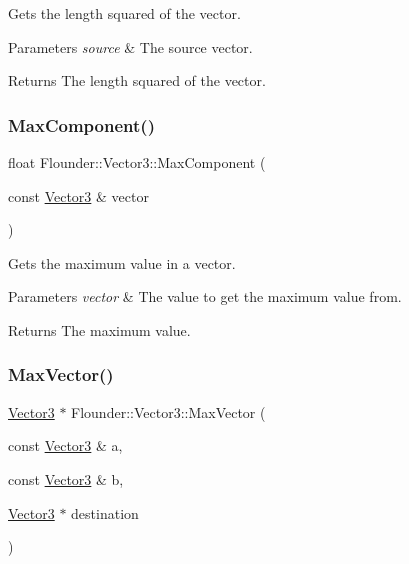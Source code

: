 Gets the length squared of the vector. 


\begin{DoxyParams}{Parameters}
{\em source} & The source vector. \\
\hline
\end{DoxyParams}
\begin{DoxyReturn}{Returns}
The length squared of the vector. 
\end{DoxyReturn}
\mbox{\label{class_flounder_1_1_vector3_ab84d4943fc80e3215387b1458bf58709}} 
\subsubsection{\texorpdfstring{Max\+Component()}{MaxComponent()}}
{\footnotesize\ttfamily float Flounder\+::\+Vector3\+::\+Max\+Component (\begin{DoxyParamCaption}\item[{const \hyperlink{class_flounder_1_1_vector3}{Vector3} \&}]{vector }\end{DoxyParamCaption})\hspace{0.3cm}{\ttfamily [static]}}



Gets the maximum value in a vector. 


\begin{DoxyParams}{Parameters}
{\em vector} & The value to get the maximum value from. \\
\hline
\end{DoxyParams}
\begin{DoxyReturn}{Returns}
The maximum value. 
\end{DoxyReturn}
\mbox{\label{class_flounder_1_1_vector3_a238085a03789f6d99c45340a82b72017}} 
\subsubsection{\texorpdfstring{Max\+Vector()}{MaxVector()}}
{\footnotesize\ttfamily \hyperlink{class_flounder_1_1_vector3}{Vector3} $\ast$ Flounder\+::\+Vector3\+::\+Max\+Vector (\begin{DoxyParamCaption}\item[{const \hyperlink{class_flounder_1_1_vector3}{Vector3} \&}]{a,  }\item[{const \hyperlink{class_flounder_1_1_vector3}{Vector3} \&}]{b,  }\item[{\hyperlink{class_flounder_1_1_vector3}{Vector3} $\ast$}]{destination }\end{DoxyParamCaption})\hspace{0.3cm}{\ttfamily [static]}}



